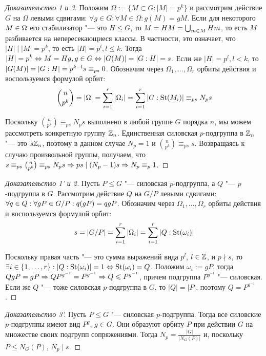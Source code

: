 \begin{proof}[Доказательство 1 и 3]
	Положим $\Omega := \{M  \subset G: |M| = p^k\}$ и рассмотрим действие $G$ на $\Omega$ левыми сдвигами: $\forall g \in G: \forall M \in \Omega: g(M) = gM$. Если для некоторого $M \hm\in \Omega$ его стабилизатор "--- это $H \le G$, то $M = HM \hm= \bigcup_{m \in M}Hm$, то есть $M$ разбивается на непересекающиеся классы. В частности, это означает, что $|H| \mid |M| = p^k$, то есть $|H| = p^l, l \le k$. Тогда $|H| = p^k \lra M = Hg, g \in G \lra |G(M)| \hm= |G : H| = s$. Если же $|H| = p^l, l < k$, то $|G(M)| = |G : H| \hm= p^{k-l}s \equiv_{ps} 0$. Обозначим через $\Omega_1, \dotsc, \Omega_r$ орбиты действия и воспользуемся формулой орбит:
	\[\binom{n}{p^k} = |\Omega| = \sum\limits_{i = 1}^r|\Omega_i| = \sum\limits_{i = 1}^r|G : \operatorname{St}(M_i)| \equiv_{ps} N_ps\]
	
	Поскольку $\binom{n}{p^k} \equiv_{ps} N_ps$ выполнено в любой группе $G$ порядка $n$, мы можем рассмотреть конкретную группу $\mathbb{Z}_n$. Единственная силовская $p$-подгруппа в $\mathbb{Z}_n$ "--- это $s\mathbb{Z}_n$, поэтому в данном случае $N_p = 1$ и $\binom{n}{p^k} \equiv_{ps} s$. Возвращаясь к случаю произвольной группы, получаем, что $s \equiv_{ps} \binom{n}{p^k} \equiv_{ps} N_ps \Rightarrow ps\mid(N_p - 1)s \Rightarrow N_p \equiv_p 1$.
\end{proof}

\begin{proof}[Доказательство 1' и 2]
	Пусть $P \le G$ "--- силовская $p$-подгруппа, а $Q$ "--- $p$-подгруппа в $G$. Рассмотрим действие $Q$ на $G / P$ левыми сдвигами: $\forall q \in Q: \forall gP \in G / P: q(gP) \hm= qgP$. Обозначим через $\Omega_1, \dotsc, \Omega_r$ орбиты действия и воспользуемся формулой орбит:
	\[s = |G / P| = \sum\limits_{i = 1}^r |\Omega_i| = \sum\limits_{i = 1}^r |Q : \operatorname{St}(\omega_i)|\]
	
	Поскольку правая часть "--- это сумма выражений вида $p^l$, $l \in \mathbb{Z}$, и $p \nmid s$, то $\exists i \hm\in \{1, \dotsc, r\}: |Q: \St(\omega_i)| = 1 \lra \St(\omega_i) = Q$. Положим $\omega_i := gP$, тогда $QgP = gP \hm\ra QP^{g^{-1}} = P^{g^{-1}} \ra Q \le P^{g^{-1}}$, причем подгруппа $P^{g^{-1}}$ "--- силовская. Если же $Q$ "--- тоже силовская $p$-подгруппа в $G$, то $|Q| = |P|$, поэтому $Q = P^{g^{-1}}$.
\end{proof}

\begin{proof}[Доказательство 3']
	Пусть $P \le G$ "--- силовская $p$-подгруппа. Тогда все силовские $p$-подгруппы имеют вид $P^g$, $g \in G$. Они образуют орбиту $P$ при действии $G$ на множестве своих подгрупп сопряжениями. Тогда $N_p = \frac{|G|}{|N_G(P)|}$ и, поскольку $P \le N_G(P)$, $N_p \mid s$.
\end{proof}

